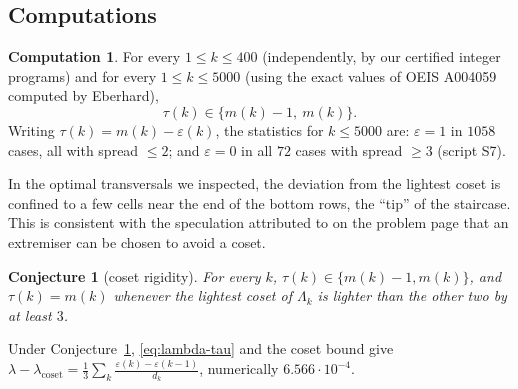 \documentclass[11pt]{amsart}
\newtheorem{conjecture}[theorem]{Conjecture}
\theoremstyle{definition}
\newtheorem{computation}[theorem]{Computation}
\newcommand{\lamc}{\lambda_{\mathrm{coset}}}
\begin{document}
\subsection{Computations}
\begin{computation}\label{comp:structure}
For every $1\le k\le400$ (independently, by our certified integer programs) and for every $1\le k\le5000$ (using the exact values of OEIS A004059 computed by Eberhard),
\[
\tau(k)\in\{m(k)-1,\ m(k)\}.
\]
Writing $\tau(k)=m(k)-\varepsilon(k)$, the statistics for $k\le5000$ are: $\varepsilon=1$ in $1058$ cases, all with spread $\le2$; and $\varepsilon=0$ in all $72$ cases with spread $\ge3$ (script S7).
\end{computation}

In the optimal transversals we inspected, the deviation from the lightest coset is confined to a few cells near the end of the bottom rows, the ``tip'' of the staircase. This is consistent with the speculation attributed to \cite{GSW77} on the problem page that an extremiser can be chosen to avoid a coset.

\begin{conjecture}[coset rigidity]\label{conj:structure}
For every $k$, $\tau(k)\in\{m(k)-1,m(k)\}$, and $\tau(k)=m(k)$ whenever the lightest coset of $\Lambda_k$ is lighter than the other two by at least $3$.
\end{conjecture}

Under Conjecture~\ref{conj:structure}, \eqref{eq:lambda-tau} and the coset bound give $\lambda-\lamc=\frac13\sum_k\frac{\varepsilon(k)-\varepsilon(k-1)}{d_k}$, numerically $6.566\cdot10^{-4}$.
\end{document}

